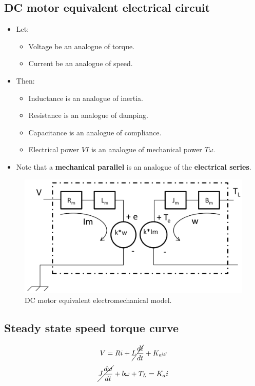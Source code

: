 \documentclass[11pt]{article}
\begin{document}
\subsection{DC motor equivalent electrical circuit}
\label{sec:org4e62a1a}
\begin{itemize}
\item Let:
\begin{itemize}
\item Voltage be an analogue of torque.
\item Current be an analogue of speed.
\end{itemize}
\item Then:
\begin{itemize}
\item Inductance is an analogue of inertia.
\item Resistance is an analogue of damping.
\item Capacitance is an analogue of compliance.
\item Electrical power \(VI\) is an analogue of mechanical power \(T \omega\).
\end{itemize}
\item Note that a \textbf{mechanical parallel} is an analogue of the \textbf{electrical series}.
\end{itemize}

\begin{figure}[htbp]
\centering
\includegraphics[width=.9\linewidth]{./images/dc-motor-electromechanical-model.png}
\caption{DC motor equivalent electromechanical model.}
\end{figure}

 \newpage
\subsection{Steady state speed torque curve}
\label{sec:orgfc17b34}
\[V = Ri + \cancel{L \frac{di}{dt}} + K_a \omega\]
\[\cancel{J \frac{d \omega}{dt}} + b \omega + T_L = K_a i\]
\end{document}
